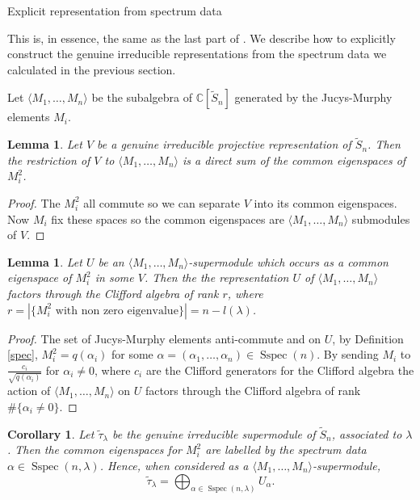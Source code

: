 \documentclass[a4paper,10pt]{amsart}
\newtheorem{corollary}[theorem]{Corollary}
\newtheorem{lemma}[theorem]{Lemma}
\DeclareMathOperator{\Sspec}{Sspec}
\begin{document}
\begin{section}{Explicit representation from spectrum data}\label{explicit}

This is, in essence, the same as the last part of \cite{VS08}. We describe how to explicitly construct the genuine irreducible representations from the spectrum data we calculated in the previous section.

Let  $\langle M_1,\ldots ,M_n \rangle$ be the subalgebra of $\mathbb{C}[\tilde{S}_n]$ generated by the Jucys-Murphy elements $M_i$. 

\begin{lemma} Let $V$ be a genuine irreducible projective representation of $\tilde{S}_n$. Then the restriction of $V$ to  $\langle M_1,\ldots ,M_n \rangle$ is a direct sum of the common eigenspaces of $M_i^2$.
\end{lemma}
\begin{proof} The $M_i^2$ all commute so we can separate $V$ into its common eigenspaces. Now $M_i$ fix these spaces so the common eigenspaces are  $\langle M_1,\ldots ,M_n \rangle$ submodules of $V$.\end{proof}
\begin{lemma} 
Let $U$ be an  $\langle M_1,\ldots ,M_n \rangle$-supermodule which occurs as a common eigenspace of $M_i^2$ in some $V$. Then the the representation $U$ of  $\langle M_1,\ldots ,M_n \rangle$ factors through the Clifford algebra of rank $r$, where $r = |\{M_i^2 \text{ with non zero eigenvalue}\}| = n - l(\lambda)$. \end{lemma}

\begin{proof} The set of Jucys-Murphy elements anti-commute and on $U$, by Definition \ref{spec}, $M_i^2 = q(\alpha_i)$ for some $\alpha = (\alpha_1,\ldots ,\alpha_n) \in \Sspec(n)$. By sending $M_i$ to $\frac{c_i}{\sqrt{q(\alpha_i)}}$ for $\alpha_i \neq 0$, where $c_i$ are the Clifford generators for the Clifford algebra  the action of  $\langle M_1,\ldots ,M_n \rangle$ on $U$ factors through the Clifford algebra of rank $\# \{\alpha_i \neq 0\}$. \end{proof}

\begin{corollary}\label{JMsummand} Let $\tilde{\tau}_\lambda$ be the genuine irreducible supermodule of $\tilde{S}_n$, associated to $\lambda$. Then the common eigenspaces for $M_i^2$ are labelled by the spectrum data $\alpha \in \Sspec(n,\lambda)$. Hence, when considered as a $\langle M_1,\ldots ,M_n \rangle$-supermodule,
$$\tilde{\tau}_\lambda = \bigoplus_{\alpha \in \Sspec(n,\lambda)} U_\alpha.$$\end{corollary}


\end{section}
\end{document}
